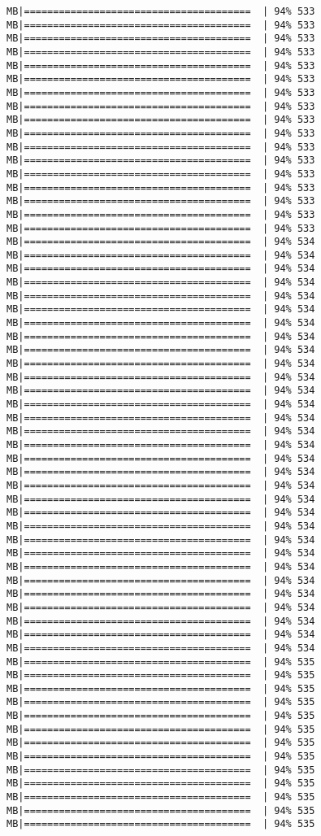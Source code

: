 \documentclass[
]{article}
\begin{document}
\begin{verbatim}
MB|=======================================  | 94% 533 MB|=======================================  | 94% 533 MB|=======================================  | 94% 533 MB|=======================================  | 94% 533 MB|=======================================  | 94% 533 MB|=======================================  | 94% 533 MB|=======================================  | 94% 533 MB|=======================================  | 94% 533 MB|=======================================  | 94% 533 MB|=======================================  | 94% 533 MB|=======================================  | 94% 533 MB|=======================================  | 94% 533 MB|=======================================  | 94% 533 MB|=======================================  | 94% 533 MB|=======================================  | 94% 533 MB|=======================================  | 94% 533 MB|=======================================  | 94% 533 MB|=======================================  | 94% 534 MB|=======================================  | 94% 534 MB|=======================================  | 94% 534 MB|=======================================  | 94% 534 MB|=======================================  | 94% 534 MB|=======================================  | 94% 534 MB|=======================================  | 94% 534 MB|=======================================  | 94% 534 MB|=======================================  | 94% 534 MB|=======================================  | 94% 534 MB|=======================================  | 94% 534 MB|=======================================  | 94% 534 MB|=======================================  | 94% 534 MB|=======================================  | 94% 534 MB|=======================================  | 94% 534 MB|=======================================  | 94% 534 MB|=======================================  | 94% 534 MB|=======================================  | 94% 534 MB|=======================================  | 94% 534 MB|=======================================  | 94% 534 MB|=======================================  | 94% 534 MB|=======================================  | 94% 534 MB|=======================================  | 94% 534 MB|=======================================  | 94% 534 MB|=======================================  | 94% 534 MB|=======================================  | 94% 534 MB|=======================================  | 94% 534 MB|=======================================  | 94% 534 MB|=======================================  | 94% 534 MB|=======================================  | 94% 534 MB|=======================================  | 94% 534 MB|=======================================  | 94% 535 MB|=======================================  | 94% 535 MB|=======================================  | 94% 535 MB|=======================================  | 94% 535 MB|=======================================  | 94% 535 MB|=======================================  | 94% 535 MB|=======================================  | 94% 535 MB|=======================================  | 94% 535 MB|=======================================  | 94% 535 MB|=======================================  | 94% 535 MB|=======================================  | 94% 535 MB|=======================================  | 94% 535 MB|=======================================  | 94% 535 
\end{verbatim}
\end{document}
